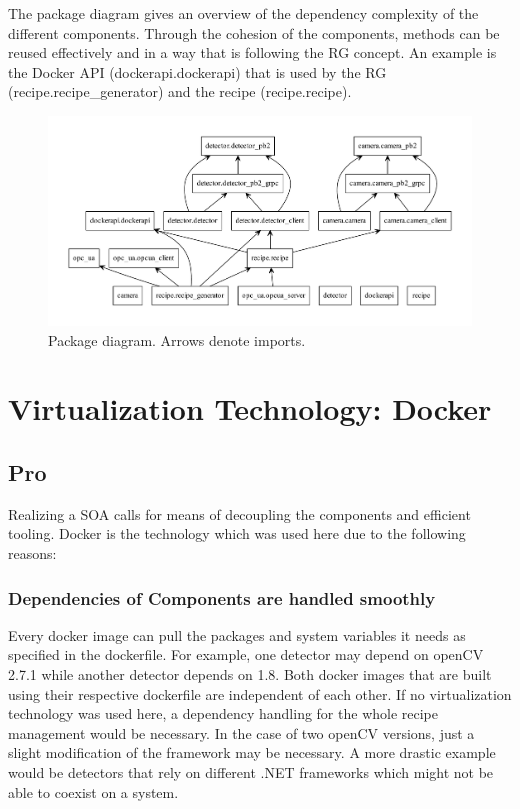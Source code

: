 The package diagram gives an overview of the dependency complexity of the different components. Through the cohesion of the components, methods can be reused effectively and in a way that is following the RG concept. An example is the Docker API (dockerapi.dockerapi) that is used by the RG (recipe.recipe\_generator) and the recipe (recipe.recipe).
\begin{figure}[ht]
	\centering
  \includegraphics[width=\textwidth]{img/packages.pdf}
	\caption[Package diagram]{Package diagram. Arrows denote imports.}
	\label{fig:Packages}
\end{figure}

\section{Virtualization Technology: Docker}
\subsection{Pro}
Realizing a SOA calls for means of decoupling the components and efficient tooling. Docker is the technology which was used here due to the following reasons:
\subsubsection{Dependencies of Components are handled smoothly} 
Every docker image can pull the packages and system variables it needs as specified in the dockerfile. For example, one detector may depend on openCV 2.7.1 while another detector depends on 1.8. Both docker images that are built using their respective dockerfile are independent of each other. If no virtualization technology was used here, a dependency handling for the whole recipe management would be necessary. In the case of two openCV versions, just a slight modification of the framework may be necessary. A more drastic example would be detectors that rely on different .NET frameworks which might not be able to coexist on a system.

